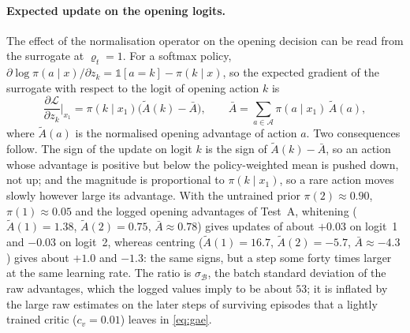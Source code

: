 \paragraph{Expected update on the opening logits.}
The effect of the normalisation operator on the opening decision can be
read from the surrogate at \(\varrho_t = 1\).
For a softmax policy, \(\partial \log \pi(a \mid x) / \partial z_k
= \mathbb{1}[a = k] - \pi(k \mid x)\), so the expected gradient of the
surrogate with respect to the logit of opening action \(k\) is
\begin{equation}
  \frac{\partial \mathcal{L}}{\partial z_k}\Big|_{x_1}
  = \pi(k \mid x_1)\bigl(\tilde{A}(k) - \bar{A}\bigr),
  \qquad
  \bar{A} = \sum_{a \in \mathcal{A}} \pi(a \mid x_1)\, \tilde{A}(a),
  \label{eq:logit-update}
\end{equation}
where \(\tilde{A}(a)\) is the normalised opening advantage of action
\(a\).
Two consequences follow.
The sign of the update on logit \(k\) is the sign of
\(\tilde{A}(k) - \bar{A}\), so an action whose advantage is positive but
below the policy-weighted mean is pushed down, not up; and the magnitude
is proportional to \(\pi(k \mid x_1)\), so a rare action moves slowly
however large its advantage.
With the untrained prior \(\pi(2) \approx 0.90\), \(\pi(1) \approx 0.05\)
and the logged opening advantages of Test~A, whitening
(\(\tilde{A}(1) = 1.38\), \(\tilde{A}(2) = 0.75\), \(\bar{A} \approx 0.78\))
gives updates of about \(+0.03\) on logit~1 and \(-0.03\) on logit~2,
whereas centring (\(\tilde{A}(1) = 16.7\), \(\tilde{A}(2) = -5.7\),
\(\bar{A} \approx -4.3\)) gives about \(+1.0\) and \(-1.3\): the same
signs, but a step some forty times larger at the same learning rate.
The ratio is \(\sigma_{\mathcal{B}}\), the batch standard deviation of the
raw advantages, which the logged values imply to be about \(53\); it is
inflated by the large raw estimates on the later steps of surviving
episodes that a lightly trained critic (\(c_v = 0.01\)) leaves in
\eqref{eq:gae}.

